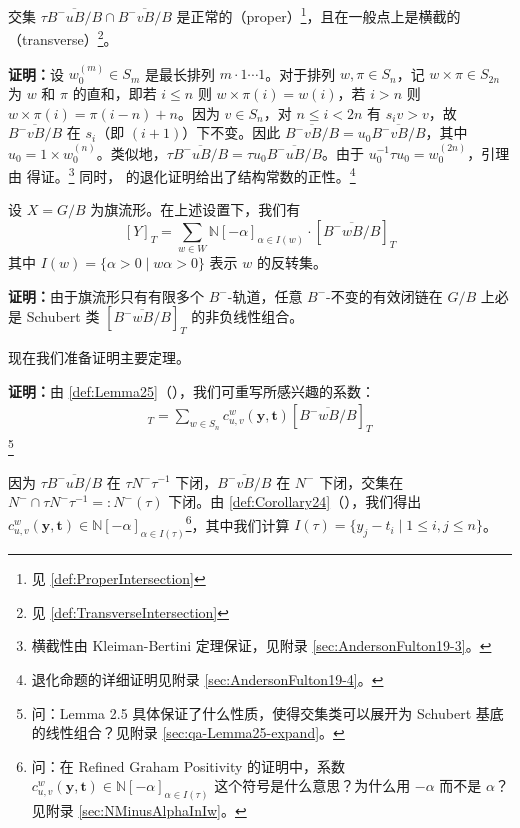 \begin{Lemma}
\label{def:Lemma25}
交集 $\tau \overline{B^-uB/B} \cap \overline{B^-vB/B}$ 是正常的（proper）\footnote{见 \cref{def:ProperIntersection}}，且在一般点上是横截的（transverse）\footnote{见 \cref{def:TransverseIntersection}}。



\textbf{证明：}设 $w_0^{(m)} \in S_m$ 是最长排列 $m \cdot 1 \cdots 1$。对于排列 $w, \pi \in S_n$，记 $w \times \pi \in S_{2n}$ 为 $w$ 和 $\pi$ 的直和，即若 $i \leq n$ 则 $w \times \pi(i) = w(i)$，若 $i > n$ 则 $w \times \pi(i) = \pi(i-n) + n$。因为 $v \in S_n$，对 $n \leq i < 2n$ 有 $s_i v > v$，故 $\overline{B^-vB/B}$ 在 $s_i$（即 $(i+1)$）下不变。因此 $\overline{B^-vB/B} = u_0 \overline{B^-vB/B}$，其中 $u_0 = 1 \times w_0^{(n)}$。类似地，$\tau \overline{B^-uB/B} = \tau u_0 \overline{B^-uB/B}$。由于 $u_0^{-1} \tau u_0 = w_0^{(2n)}$，引理由 \cite[Section 19.3]{anderson2023} 得证。\footnote{横截性由 Kleiman-Bertini 定理保证，见附录 \cref{sec:AndersonFulton19-3}。} 同时，\cite[ Theorem 19.4.4]{anderson2023} 的退化证明给出了结构常数的正性。\footnote{退化命题的详细证明见附录 \cref{sec:AndersonFulton19-4}。}
\end{Lemma}

\begin{Corollary}
\label{def:Corollary24}
设 $X = G/B$ 为旗流形。在上述设置下，我们有
$$[Y]_T = \sum_{w \in W} \mathbb{N}[-\alpha]_{\alpha \in I(w)} \cdot [\overline{B^-wB/B}]_T$$
其中 $I(w) = \{\alpha > 0 \mid w\alpha > 0\}$ 表示 $w$ 的反转集。



\textbf{证明：}由于旗流形只有有限多个 $B^-$-轨道，任意 $B^-$-不变的有效闭链在 $G/B$ 上必是 Schubert 类 $[\overline{B^-wB/B}]_T$ 的非负线性组合。
\end{Corollary}

现在我们准备证明主要定理。



\textbf{证明：}由 \cref{def:Lemma25}（\cite[Lemma 2.5]{GX2025}），我们可重写所感兴趣的系数：
\begin{align*}
[\tau \overline{B^-uB/B} \cap \overline{B^-vB/B}]_T = \sum_{w \in S_n} c^w_{u,v}(\mathbf{y}, \mathbf{t})[\overline{B^-wB/B}]_T
\end{align*}\footnote{问：Lemma 2.5 具体保证了什么性质，使得交集类可以展开为 Schubert 基底的线性组合？见附录 \cref{sec:qa-Lemma25-expand}。}

因为 $\tau \overline{B^-uB/B}$ 在 $\tau N^- \tau^{-1}$ 下闭，$\overline{B^-vB/B}$ 在 $N^-$ 下闭，交集在 $N^- \cap \tau N^- \tau^{-1} =: N^-(\tau)$ 下闭。由 \cref{def:Corollary24}（\cite[Corollary 2.4]{GX2025}），我们得出 $c^w_{u,v}(\mathbf{y}, \mathbf{t}) \in \mathbb{N}[-\alpha]_{\alpha \in I(\tau)}$\footnote{问：在 Refined Graham Positivity 的证明中，系数 $c^w_{u,v}(\mathbf{y}, \mathbf{t}) \in \mathbb{N}[-\alpha]_{\alpha \in I(\tau)}$ 这个符号是什么意思？为什么用 $-\alpha$ 而不是 $\alpha$？见附录 \cref{sec:NMinusAlphaInIw}。}，其中我们计算 $I(\tau) = \{y_j - t_i \mid 1 \leq i,j \leq n\}$。

